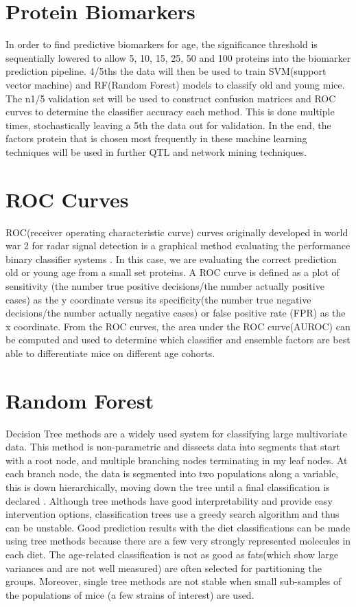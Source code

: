 \documentclass[a4paper,11pt,twoside]{book}
\begin{document}
	
	\section{Protein Biomarkers}
	
    In order to find predictive biomarkers for age, the significance threshold is sequentially lowered to allow 5, 10, 15, 25, 50 and 100 proteins into the biomarker prediction pipeline. 4/5ths the data will then be used to train SVM(support vector machine) and RF(Random Forest) models to classify old and young mice. The n1/5 validation set will be used to construct confusion matrices and ROC curves to determine the classifier accuracy each method. This is done multiple times, stochastically leaving a 5th the data out for validation. In the end, the factors protein that is chosen most frequently in these machine learning techniques will be used in further QTL and network mining techniques.
	
	\section{ROC Curves}
	
    ROC(receiver operating characteristic curve) curves originally developed in world war 2 for radar signal detection is a graphical method evaluating the performance binary classifier systems \citep{HajianTilaki2013}. In this case, we are evaluating the correct prediction old or young age from a small set proteins. A ROC curve is defined as a plot of sensitivity (the number true positive decisions/the number actually positive cases) as the y coordinate versus its specificity(the number true negative decisions/the number actually negative cases) or false positive rate (FPR) as the x coordinate. From the ROC curves, the area under the ROC curve(AUROC) can be computed and used to determine which classifier and ensemble factors are best able to differentiate mice on different age cohorts.
	
	\section{Random Forest}
	
    Decision Tree methods are a widely used system for classifying large multivariate data. This method is non-parametric and dissects data into segments that start with a root node, and multiple branching nodes terminating in my leaf nodes. At each branch node, the data is segmented into two populations along a variable, this is down hierarchically, moving down the tree until a final classification is declared \citep{Song2015DecisionTrees}. Although tree methods have good interpretability and provide easy intervention options, classification trees use a greedy search algorithm and thus can be unstable\citep{Song2015DecisionTrees}. Good prediction results with the diet classifications can be made using tree methods because there are a few very strongly represented molecules in each diet. The age-related classification is not as good as fats(which show large variances and are not well measured) are often selected for partitioning the groups. Moreover, single tree methods are not stable when small sub-samples of the populations of mice (a few strains of interest) are used.
    
\end{document}
